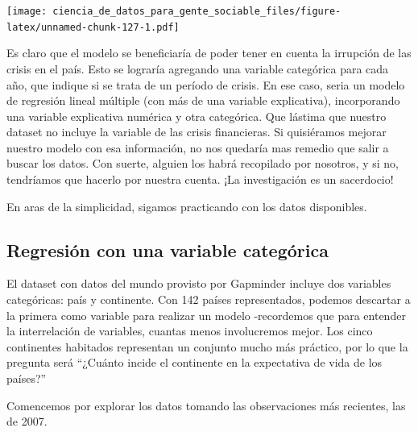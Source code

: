 \documentclass[spanish,]{book}
\newenvironment{Shaded}{\begin{snugshade}}{\end{snugshade}}
\newcommand{\DataTypeTok}[1]{\textcolor[rgb]{0.13,0.29,0.53}{#1}}
\newcommand{\DecValTok}[1]{\textcolor[rgb]{0.00,0.00,0.81}{#1}}
\newcommand{\KeywordTok}[1]{\textcolor[rgb]{0.13,0.29,0.53}{\textbf{#1}}}
\newcommand{\NormalTok}[1]{#1}
\newcommand{\OperatorTok}[1]{\textcolor[rgb]{0.81,0.36,0.00}{\textbf{#1}}}
\newcommand{\StringTok}[1]{\textcolor[rgb]{0.31,0.60,0.02}{#1}}
\begin{document}
\texttt{[image: ciencia\_de\_datos\_para\_gente\_sociable\_files/figure-latex/unnamed-chunk-127-1.pdf]}

Es claro que el modelo se beneficiaría de poder tener en cuenta la irrupción de las crisis en el país. Esto se lograría agregando una variable categórica para cada año, que indique si se trata de un período de crisis. En ese caso, seria un modelo de regresión lineal múltiple (con más de una variable explicativa), incorporando una variable explicativa numérica y otra categórica. Que lástima que nuestro dataset no incluye la variable de las crisis financieras. Si quisiéramos mejorar nuestro modelo con esa información, no nos quedaría mas remedio que salir a buscar los datos. Con suerte, alguien los habrá recopilado por nosotros, y si no, tendríamos que hacerlo por nuestra cuenta. ¡La investigación es un sacerdocio!

En aras de la simplicidad, sigamos practicando con los datos disponibles.

\hypertarget{regresiuxf3n-con-una-variable-categuxf3rica}{%
\subsection{Regresión con una variable categórica}\label{regresiuxf3n-con-una-variable-categuxf3rica}}

El dataset con datos del mundo provisto por Gapminder incluye dos variables categóricas: país y continente. Con 142 países representados, podemos descartar a la primera como variable para realizar un modelo -recordemos que para entender la interrelación de variables, cuantas menos involucremos mejor. Los cinco continentes habitados representan un conjunto mucho más práctico, por lo que la pregunta será ``¿Cuánto incide el continente en la expectativa de vida de los países?''

Comencemos por explorar los datos tomando las observaciones más recientes, las de 2007.

\begin{Shaded}
\end{Shaded}
\end{document}
